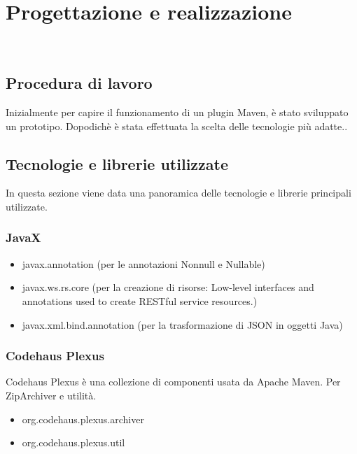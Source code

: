
\chapter{Progettazione e realizzazione} %
\label{cap:progettazione}

\\

\section{Procedura di lavoro}
Inizialmente per capire il funzionamento di un plugin Maven, è stato sviluppato un prototipo. 
Dopodichè è stata effettuata la scelta delle tecnologie più adatte..

\section{Tecnologie e librerie utilizzate}
\label{sec:tecnologie-strumenti}

In questa sezione viene data una panoramica delle tecnologie e librerie principali utilizzate.

\subsection*{JavaX}
\begin{itemize}
    \item javax.annotation (per le annotazioni Nonnull e Nullable)
    \item javax.ws.rs.core (per la creazione di risorse: Low-level interfaces and annotations used to create RESTful service resources.)
    \item javax.xml.bind.annotation (per la trasformazione di JSON in oggetti Java)
\end{itemize}


\subsection*{Codehaus Plexus}
Codehaus Plexus è una collezione di componenti usata da Apache Maven.
Per ZipArchiver e utilità.
\begin{itemize}
    \item org.codehaus.plexus.archiver
    \item org.codehaus.plexus.util
\end{itemize}

